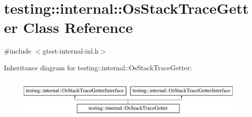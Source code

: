\hypertarget{classtesting_1_1internal_1_1_os_stack_trace_getter}{\section{testing\-:\-:internal\-:\-:Os\-Stack\-Trace\-Getter Class Reference}
\label{classtesting_1_1internal_1_1_os_stack_trace_getter}
}


{\ttfamily \#include $<$gtest-\/internal-\/inl.\-h$>$}

Inheritance diagram for testing\-:\-:internal\-:\-:Os\-Stack\-Trace\-Getter\-:\begin{figure}[H]
\begin{center}
\leavevmode
\includegraphics[height=2.000000cm]{classtesting_1_1internal_1_1_os_stack_trace_getter}
\end{center}
\end{figure}
